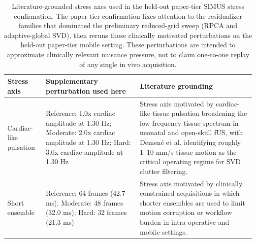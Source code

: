 \begin{table}[t]
\centering
\scriptsize
\setlength{\tabcolsep}{4pt}
\begin{tabular}{@{}P{2.8cm} P{4.8cm} P{5.0cm}@{}}
\hline
Stress axis & Supplementary perturbation used here & Literature grounding \\
\hline
Cardiac-like pulsation & Reference: 1.0x cardiac amplitude at 1.30 Hz; Moderate: 2.0x cardiac amplitude at 1.30 Hz; Hard: 3.0x cardiac amplitude at 1.30 Hz & Stress axis motivated by cardiac-like tissue pulsation broadening the low-frequency tissue spectrum in neonatal and open-skull fUS, with Demen\'e et al. identifying roughly 1--10 mm/s tissue motion as the critical operating regime for SVD clutter filtering. \\
Short ensemble & Reference: 64 frames (42.7 ms); Moderate: 48 frames (32.0 ms); Hard: 32 frames (21.3 ms) & Stress axis motivated by clinically constrained acquisitions in which shorter ensembles are used to limit motion corruption or workflow burden in intra-operative and mobile settings. \\
\hline
\end{tabular}
\caption{Literature-grounded stress axes used in the held-out paper-tier SIMUS stress confirmation. The paper-tier confirmation fixes attention to the residualizer families that dominated the preliminary reduced-grid sweep (RPCA and adaptive-global SVD), then reruns those clinically motivated perturbations on the held-out paper-tier mobile setting. These perturbations are intended to approximate clinically relevant nuisance pressure, not to claim one-to-one replay of any single in vivo acquisition.}
\label{tab:simus_clinical_stress_frontier_provenance}
\end{table}
